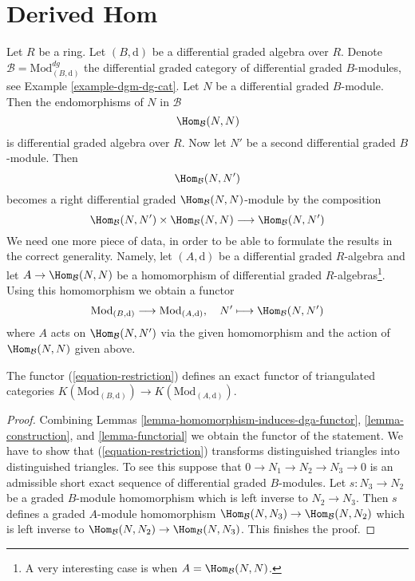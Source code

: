 \section{Derived Hom}
\label{section-restriction}

\noindent
Let $R$ be a ring. Let $(B, \text{d})$ be a differential graded algebra
over $R$. Denote $\mathcal{B} = \text{Mod}^{dg}_{(B, \text{d})}$
the differential graded category of differential graded $B$-modules, see
Example \ref{example-dgm-dg-cat}. Let $N$ be a differential graded $B$-module.
Then the endomorphisms of $N$ in $\mathcal{B}$
$$
\Hom_\mathcal{B}(N, N)
$$
is differential graded algebra over $R$. Now let $N'$ be a second differential
graded $B$-module. Then
$$
\Hom_\mathcal{B}(N, N')
$$
becomes a right differential graded $\Hom_\mathcal{B}(N, N)$-module by the
composition
$$
\Hom_\mathcal{B}(N, N') \times \Hom_\mathcal{B}(N, N)
\longrightarrow
\Hom_\mathcal{B}(N, N')
$$
We need one more piece of data, in order to be able to formulate the
results in the correct generality. Namely, let $(A, \text{d})$ be a
differential graded $R$-algebra and let $A \to \Hom_\mathcal{B}(N, N)$
be a homomorphism of differential graded $R$-algebras\footnote{A very
interesting case is when $A = \Hom_\mathcal{B}(N, N)$.}. Using this
homomorphism we obtain a functor
\begin{equation}
\label{equation-restriction}
\text{Mod}_{(B, \text{d})}
\longrightarrow
\text{Mod}_{(A, \text{d})},\quad
N' \longmapsto \Hom_\mathcal{B}(N, N')
\end{equation}
where $A$ acts on $\Hom_\mathcal{B}(N, N')$ via the given homomorphism
and the action of $\Hom_\mathcal{B}(N, N)$ given above.

\begin{lemma}
\label{lemma-restriction-homotopy}
The functor (\ref{equation-restriction}) defines an exact functor
of triangulated categories
$K(\text{Mod}_{(B, \text{d})}) \to K(\text{Mod}_{(A, \text{d})})$.
\end{lemma}

\begin{proof}
Combining
Lemmas \ref{lemma-homomorphism-induces-dga-functor},
\ref{lemma-construction}, and
\ref{lemma-functorial}
we obtain the functor of the statement.
We have to show that (\ref{equation-restriction}) transforms distinguished
triangles into distinguished triangles. To see this
suppose that $0 \to N_1 \to N_2 \to N_3 \to 0$ is an admissible short
exact sequence of differential graded $B$-modules. Let $s : N_3 \to N_2$
be a graded $B$-module homomorphism which is left inverse to $N_2 \to N_3$.
Then $s$ defines a graded $A$-module homomorphism
$\Hom_\mathcal{B}(N, N_3) \to \Hom_\mathcal{B}(N, N_2)$
which is left inverse to
$\Hom_\mathcal{B}(N, N_2) \to \Hom_\mathcal{B}(N, N_3)$.
This finishes the proof.
\end{proof}

